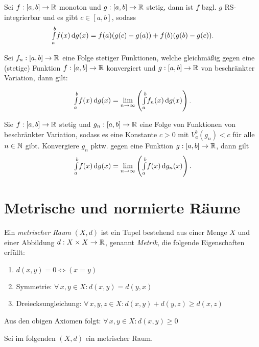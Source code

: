 \documentclass{cheat-sheet}
\begin{document}
\begin{satz}
Sei $f : [a, b] \to \mathbb{R}$ monoton und $g : [a, b] \to \mathbb{R}$ stetig, dann ist $f$ bzgl. $g$ RS-integrierbar und es gibt $c \in [a, b]$, sodass
\[ {\textstyle \int\limits_{a}^{b}} f(x) \,\mathrm{d} g(x) = f(a)(g(c) - g(a)) + f(b)(g(b) - g(c)). \]
\end{satz}

\begin{satz}
Sei $f_n : [a, b] \to \mathbb{R}$ eine Folge stetiger Funktionen, welche gleichmäßig gegen eine (stetige) Funktion $f : [a, b] \to \mathbb{R}$ konvergiert und $g : [a, b] \to \mathbb{R}$ von beschränkter Variation, dann gilt:

\[ {\textstyle \int\limits_{a}^{b}} f(x) \,\mathrm{d} g(x) = \lim_{n \to \infty} \left({\textstyle \int\limits_{a}^{b}} f_n(x) \,\mathrm{d} g(x)\right). \]
\end{satz}

\begin{satz}
Sie $f : [a, b] \to \mathbb{R}$ stetig und $g_n : [a, b] \to \mathbb{R}$ eine Folge von Funktionen von beschränkter Variation, sodass es eine Konstante $c > 0$ mit $V_a^b(g_n) < c$ für alle $n \in \mathbb{N}$ gibt. Konvergiere $g_n$ pktw. gegen eine Funktion $g : [a, b] \to \mathbb{R}$, dann gilt
\[ {\textstyle \int\limits_{a}^{b}} f(x) \,\mathrm{d} g(x) = \lim_{n \to \infty} \left({\textstyle \int\limits_{a}^{b}} f(x) \,\mathrm{d} g_n(x)\right). \]
\end{satz}


\section{Metrische und normierte Räume}

\begin{defn}
Ein \emph{metrischer Raum} $(X, d)$ ist ein Tupel bestehend aus einer Menge $X$ und einer Abbildung $d : X \times X \to \mathbb{R}$, genannt \emph{Metrik}, die folgende Eigenschaften erfüllt:

\begin{enumerate}
  \item $d(x, y) = 0 \iff (x = y)$
  \item Symmetrie: $\forall\,x, y \in X : d(x, y) = d(y, x)$
  \item Dreiecksungleichung: $\forall\, x, y, z \in X : d(x, y) + d(y, z) \ge d(x, z)$
\end{enumerate}
\end{defn}

\begin{bem}
Aus den obigen Axiomen folgt: $\forall\,x, y \in X : d(x, y) \ge 0$
\end{bem}

\begin{nota}
Sei im folgenden $(X, d)$ ein metrischer Raum.
\end{nota}
\end{document}
